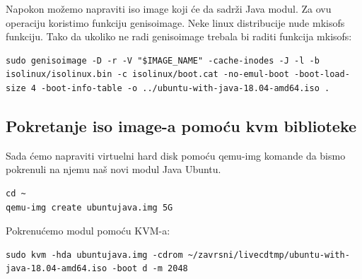 \documentclass[12pt,vi]{mitthesis}
\begin{document}
\noindent
Napokon možemo napraviti iso image koji će da sadrži Java modul. Za ovu operaciju koristimo funkciju genisoimage. Neke linux distribucije nude mkisofs funkciju. Tako da ukoliko ne radi genisoimage trebala bi raditi funkcija mkisofs:
\begin{lstlisting}[style=BashInputStyle]
sudo genisoimage -D -r -V "$IMAGE_NAME" -cache-inodes -J -l -b isolinux/isolinux.bin -c isolinux/boot.cat -no-emul-boot -boot-load-size 4 -boot-info-table -o ../ubuntu-with-java-18.04-amd64.iso .
\end{lstlisting}

\subsection*{Pokretanje iso image-a pomoću kvm biblioteke}
\indent
Sada ćemo napraviti virtuelni hard disk pomoću qemu-img komande da bismo pokrenuli na njemu naš novi modul Java Ubuntu.
\begin{lstlisting}[style=BashInputStyle]
cd ~
qemu-img create ubuntujava.img 5G
\end{lstlisting}

\noindent 
Pokrenućemo modul pomoću KVM-a:
\begin{lstlisting}[style=BashInputStyle]
sudo kvm -hda ubuntujava.img -cdrom ~/zavrsni/livecdtmp/ubuntu-with-java-18.04-amd64.iso -boot d -m 2048
\end{lstlisting}
\end{document}
